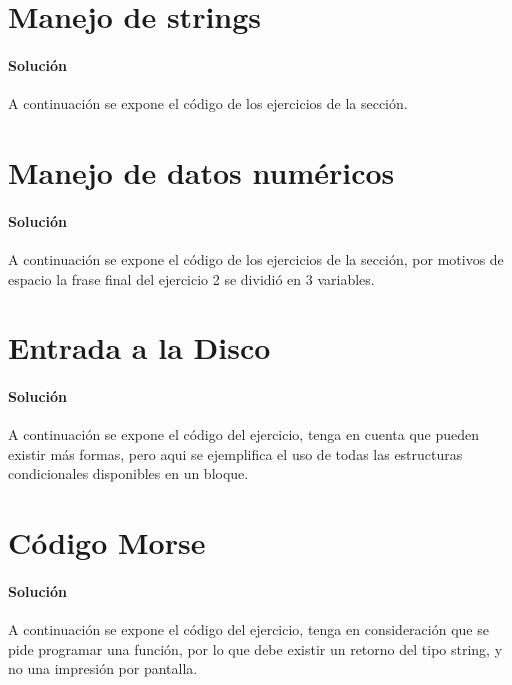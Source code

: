 
\section{Manejo de strings}

  \paragraph{Solución}
  A continuación se expone el código de los ejercicios de la sección.
  
  
    
\section{Manejo de datos numéricos}

    \paragraph{Solución}
    A continuación se expone el código de los ejercicios de la sección, por motivos de espacio la frase final del ejercicio 2 se dividió en 3 variables.
    
    

\pagebreak[4]

\section{Entrada a la Disco}

    \paragraph{Solución}
    A continuación se expone el código del ejercicio, tenga en cuenta que pueden existir más formas, pero aqui se ejemplifica el uso de todas las estructuras condicionales disponibles en un bloque.
    
    
    
\section{Código Morse}

    \paragraph{Solución}
    A continuación se expone el código del ejercicio, tenga en consideración que se pide programar una función, por lo que debe existir un retorno del tipo string, y no una impresión por pantalla.
    
    
    